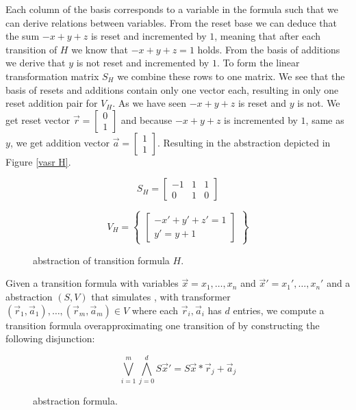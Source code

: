 Each column of the basis corresponds to a variable in the formula such that we can derive relations between variables. From the reset base we can deduce that the sum $-x + y + z$ is reset and incremented by $1$, meaning that after each transition of $H$ we know that $-x + y + z = 1$ holds. From the basis of additions we derive that $y$ is not reset and incremented by $1$. To form the linear transformation matrix $S_H$ we combine these rows to one matrix. We see that the basis of resets and additions contain only one vector each, resulting in only one reset addition pair for $V_H$. As we have seen $-x + y + z$ is reset and $y$ is not. We get reset vector $\vec{r} = \begin{bmatrix} 0 \\ 1 \end{bmatrix}$ and because $-x + y + z$ is incremented by $1$, same as $y$, we get addition vector $\vec{a} = \begin{bmatrix} 1 \\ 1 \end{bmatrix}$. Resulting in the \qvasr abstraction depicted in Figure \ref{vasr  H}.
\vspace*{-2em}
\begin{figure}[H]
	\begin{center}
		\begin{minipage}{0.3\linewidth}
			\begin{equation*}
				S_H = \begin{bmatrix} -1 & 1 & 1 \\ 0 & 1 & 0 \end{bmatrix}
			\end{equation*}
		\end{minipage}
		\begin{minipage}{0.6\linewidth}
			\begin{equation*}
				V_H = \begin{Bmatrix} \begin{bmatrix} -x' + y' + z' = 1\\ y' = y + 1 \end{bmatrix} \end{Bmatrix}
			\end{equation*}
		\end{minipage}
		\caption{\qvasr abstraction of transition formula $H$.}
		\label{vasr H}
	\end{center}
\end{figure}
\vspace*{-2em}
Given a transition formula \trf with variables $\vec{x} = x_1, \ldots, x_n$ and $\vec{x}' = x_1', \ldots, x_n'$ and a \qvasr abstraction $(S, V)$ that simulates \trf, with transformer $(\vec{r}_1, \vec{a}_1), \ldots, (\vec{r}_m, \vec{a}_m) \in V$ where each $\vec{r}_i, \vec{a}_i$ has $d$ entries, we compute a transition formula overapproximating one transition of \trf by constructing the following disjunction:
\begin{figure}[H]
	\begin{equation*}
		\bigvee\limits_{i=1}^m \bigwedge\limits_{j=0}^d S\vec{x}' = S\vec{x} * \vec{r}_j + \vec{a}_j
	\end{equation*}
	\label{vasrTrans}
	\caption{\qvasr abstraction formula.}
\end{figure}

